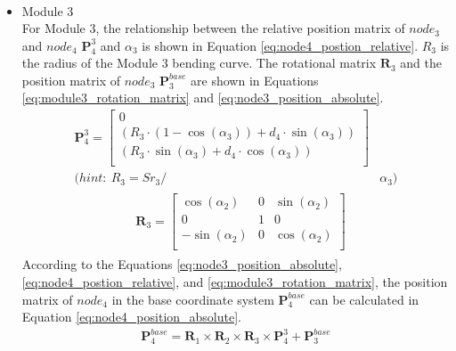 \begin{itemize}
\begin{align}
    \end{align}
    \item Module 3 \\
    For Module 3, the relationship between the relative position matrix of $node_3$ and $node_4$ $\textbf{P}_{4}^{3}$ 
    and $\alpha_3$ is shown in Equation \ref{eq:node4_postion_relative}. $R_3$ is the radius of the Module 3 bending 
    curve. The rotational matrix $\textbf{R}_{3}$ and the position matrix of $node_3$ $\textbf{P}_{3}^{base}$ are shown 
    in Equations \ref*{eq:module3_rotation_matrix} and \ref{eq:node3_position_absolute}.
    \begin{align}
        \textbf{P}_{4}^{3} = 
        \begin{bmatrix}
            0 \\
            (R_3\cdot(1-\cos(\alpha_3)) + d_4\cdot \sin(\alpha_3)) \\
            (R_3\cdot \sin(\alpha_3) + d_4\cdot \cos(\alpha_3)) \\
        \end{bmatrix}&
        \label{eq:node4_postion_relative} \\
        \nonumber (hint: \ R_3 = {Sr}_3/ &\alpha_3)
    \end{align}
    \vspace{-15mm}
    \begin{align}
        &\begin{aligned}
            \textbf{R}_{3} = 
            \begin{bmatrix}
                \cos(\alpha_2) & 0 & \sin(\alpha_2) \\
                0 & 1 & 0 \\
                -\sin(\alpha_2) & 0 & \cos(\alpha_2) \\
            \end{bmatrix}
        \end{aligned}
        \label{eq:module3_rotation_matrix}
    \end{align}
    According to the Equations \ref{eq:node3_position_absolute}, \ref{eq:node4_postion_relative}, and 
    \ref*{eq:module3_rotation_matrix}, the position matrix of $node_{4}$ in the base coordinate system 
    $\textbf{P}_{4}^{base}$ can be calculated in Equation \ref{eq:node4_position_absolute}.
    \begin{align}
        \textbf{P}_{4}^{base} = \textbf{R}_{1} \times\textbf{R}_{2} 
        \times\textbf{R}_{3} \times \textbf{P}_{4}^{3} + \textbf{P}_{3}^{base}
        \label{eq:node4_position_absolute}

\end{align}
\end{itemize}
